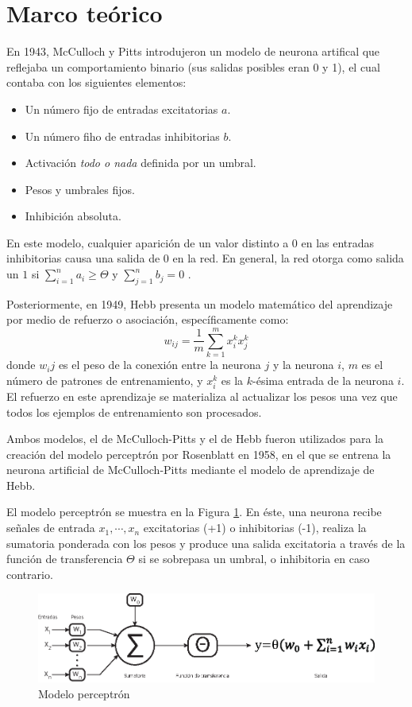 \documentclass[journal]{IEEEtran}
\begin{document}
\section{Marco teórico}
\label{sec:marco_teorico}
En 1943, McCulloch y Pitts introdujeron un modelo de neurona artifical que reflejaba un comportamiento binario (sus salidas posibles eran 0 y 1), el cual contaba con los siguientes elementos:
\begin{itemize}
	\item Un número fijo de entradas excitatorias $a$.
	\item Un número fiho de entradas inhibitorias $b$.
	\item Activación \emph{todo o nada} definida por un umbral.
	\item Pesos y umbrales fijos.
	\item Inhibición absoluta.
\end{itemize}
En este modelo, cualquier aparición de un valor distinto a $0$ en las entradas inhibitorias causa una salida de $0$ en la red.
En general, la red otorga como salida un $1$ si $\sum_{i=1}^{n} a_i \ge \Theta $ y $\sum_{j=1}^{n} b_j = 0$ .


Posteriormente, en 1949, Hebb presenta un modelo matemático del aprendizaje por medio de refuerzo o asociación, específicamente como:
\begin{equation}
w_{ij} = \frac{1}{m}\sum_{k=1}^{m}x_i^k x_j^k
\end{equation}
donde $w_ij$ es el peso de la conexión entre la neurona $j$ y la neurona $i$, $m$ es el número de patrones de entrenamiento, y $x_i^k$ es la $k$-ésima entrada de la neurona $i$.
El refuerzo en este aprendizaje se materializa al actualizar los pesos una vez que todos los ejemplos de entrenamiento son procesados.


Ambos modelos, el de McCulloch-Pitts y el de Hebb fueron utilizados para la creación del modelo perceptrón por Rosenblatt en 1958, en el que se entrena la neurona artificial de McCulloch-Pitts mediante el modelo de aprendizaje de Hebb.

El modelo perceptrón se muestra en la Figura \ref{fig:perceptron-rna}.
En éste, una neurona recibe señales de entrada $x_1,\cdots,x_n$ excitatorias (+1) o inhibitorias (-1), realiza la sumatoria ponderada con los pesos y produce una salida excitatoria a través de la función de transferencia $\Theta$ si se sobrepasa un umbral, o inhibitoria en caso contrario.

\begin{figure}[tb]
	\centering
	\includegraphics[]{imagenes/rna}
	\caption{Modelo perceptrón}
	\label{fig:perceptron-rna}
\end{figure}
\end{document}
